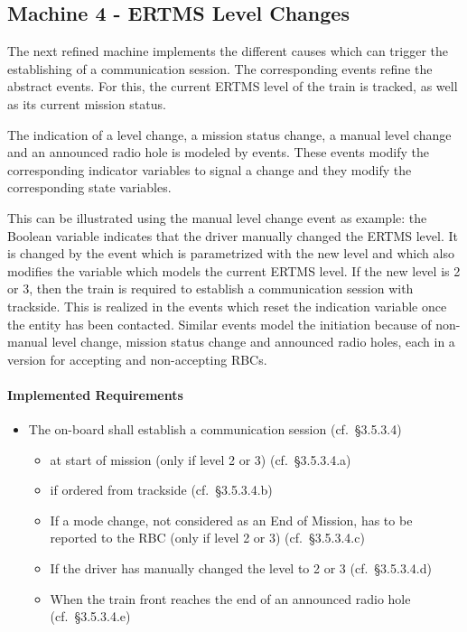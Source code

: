 \documentclass{template/openetcs_article}
\begin{document}
\subsection{Machine 4 - ERTMS Level Changes}
\label{sec:machine-4-ertms}

The next refined machine implements the different causes which can trigger the
establishing of a communication session. The corresponding events refine the
abstract  events. For this, the current
ERTMS level of the train is tracked, as well as its current mission status.

The indication of a level change, a mission status change, a manual level change
and an announced radio hole is modeled by events. These events modify the
corresponding indicator variables to signal a change and they modify the
corresponding state variables.

This can be illustrated using the manual level change event as example: the
Boolean variable  indicates that the driver
manually changed the ERTMS level. It is changed by the
 event which is parametrized with the new level and
which also modifies the  variable which models the current
ERTMS level. If the new level is 2 or 3, then the train is required to establish
a communication session with trackside. This is realized in the
 events which reset the
indication variable once the entity has been contacted.  Similar events model
the initiation because of non-manual level change, mission status change and
announced radio holes, each in a version for accepting and non-accepting RBCs.

\paragraph{Implemented Requirements}
\label{sec:impl-requ-3}

\begin{itemize}
\item The on-board shall establish a communication session (cf.~§3.5.3.4)
  \begin{itemize}
  \item at start of mission (only if level 2 or 3) (cf.~§3.5.3.4.a)
  \item if ordered from trackside (cf.~§3.5.3.4.b)
  \item If a mode change, not considered as an End of Mission, has to be
    reported to the RBC (only if level 2 or 3) (cf.~§3.5.3.4.c)
  \item If the driver has manually changed the level to 2 or 3 (cf.~§3.5.3.4.d)
  \item When the train front reaches the end of an announced radio hole
    (cf.~§3.5.3.4.e)
  \end{itemize}
\end{itemize}
\end{document}

